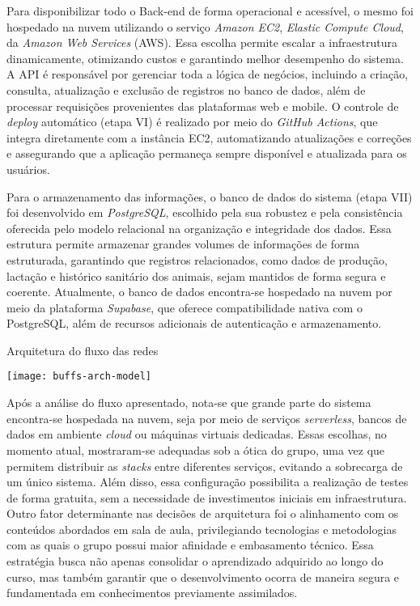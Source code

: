 Para disponibilizar todo o Back-end de forma operacional e acessível, o mesmo foi hospedado na nuvem utilizando o serviço \textit{Amazon EC2}, \textit{Elastic Compute Cloud}, da \textit{Amazon Web Services} (AWS). Essa escolha permite escalar a infraestrutura dinamicamente, otimizando custos e garantindo melhor desempenho do sistema. A API é responsável por gerenciar toda a lógica de negócios, incluindo a criação, consulta, atualização e exclusão de registros no banco de dados, além de processar requisições provenientes das plataformas web e mobile. O controle de \textit{deploy} automático (etapa VI) é realizado por meio do \textit{GitHub Actions}, que integra diretamente com a instância EC2, automatizando atualizações e correções e assegurando que a aplicação permaneça sempre disponível e atualizada para os usuários.

Para o armazenamento das informações, o banco de dados do sistema (etapa VII) foi desenvolvido em \textit{PostgreSQL}, escolhido pela sua robustez e pela consistência oferecida pelo modelo relacional na organização e integridade dos dados. Essa estrutura permite armazenar grandes volumes de informações de forma estruturada, garantindo que registros relacionados, como dados de produção, lactação e histórico sanitário dos animais, sejam mantidos de forma segura e coerente. Atualmente, o banco de dados encontra-se hospedado na nuvem por meio da plataforma \textit{Supabase}, que oferece compatibilidade nativa com o PostgreSQL, além de recursos adicionais de autenticação e armazenamento.

\begin{flowchart}[!htb]
\centering
\caption{Arquitetura do fluxo das redes}%
\label{fcht:arquitetura}
\texttt{[image: buffs-arch-model]}
\end{flowchart}

Após a análise do fluxo apresentado, nota-se que grande parte do sistema encontra-se hospedada na nuvem, seja por meio de serviços \textit{serverless}, bancos de dados em ambiente \textit{cloud} ou máquinas virtuais dedicadas. Essas escolhas, no momento atual, mostraram-se adequadas sob a ótica do grupo, uma vez que permitem distribuir as \textit{stacks} entre diferentes serviços, evitando a sobrecarga de um único sistema. Além disso, essa configuração possibilita a realização de testes de forma gratuita, sem a necessidade de investimentos iniciais em infraestrutura. Outro fator determinante nas decisões de arquitetura foi o alinhamento com os conteúdos abordados em sala de aula, privilegiando tecnologias e metodologias com as quais o grupo possui maior afinidade e embasamento técnico. Essa estratégia busca não apenas consolidar o aprendizado adquirido ao longo do curso, mas também garantir que o desenvolvimento ocorra de maneira segura e fundamentada em conhecimentos previamente assimilados.
